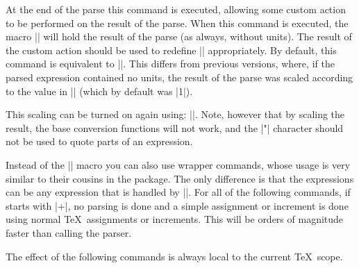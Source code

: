 \begin{command}{\pgfmathpostparse}

  At the end of the parse this command is executed, allowing some
  custom action to be performed on the result of the parse. When this
  command is executed, the macro |\pgfmathresult| will hold the result
  of the parse (as always, without units). The result of the custom
  action should be used to redefine |\pgfmathresult| appropriately.
  By default, this command is equivalent to |\relax|. This differs
  from previous versions, where, if the parsed expression contained
  no units, the result of the parse was scaled according to the value
  in |\pgfmathresultunitscale| (which by default was |1|).

  This scaling can be  turned on again using:
  |\let\pgfmathpostparse=\pgfmathscaleresult|.
  Note, however that by scaling the result, the base conversion
  functions will not work, and the |"| character should not be
  used to quote parts of an expression.

\end{command}

Instead of the |\pgfmathparse| macro you can also use wrapper commands,
whose usage is very similar to their cousins in the \calcname{}
package. The only difference is that the expressions can be any
expression that is handled by |\pgfmathparse|.
For all of the following commands, if  starts with
|+|, no parsing is done and a simple assignment or increment is done
using normal \TeX\ assignments or increments. This will be orders of
magnitude faster than calling the parser.

The effect of the following commands is always local to the current
\TeX\ scope.

